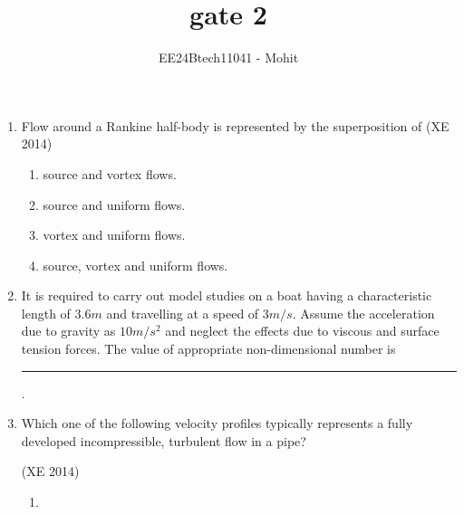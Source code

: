 \documentclass[journal,12pt,onecolumn]{IEEEtran}
\theoremstyle{remark}
\begin{document}
\title{gate 2}
\author{EE24Btech11041 - Mohit}
\maketitle
\renewcommand{\thefigure}{\theenumi}
\renewcommand{\thetable}{\theenumi}


\begin{enumerate}

\item Flow around a Rankine half-body is represented by the superposition of
\hfill{(XE 2014)}
\begin{enumerate}

\item source and vortex flows.
\item source and uniform flows.
\item vortex and uniform flows.
\item source, vortex and uniform flows.

\end{enumerate}


\item It is required to carry out model studies on a boat having a characteristic length of $3.6 m$ and travelling at a speed of $3 m/s$. Assume the acceleration due to gravity as $10 m/s^{2}$ and neglect the effects due to viscous and surface tension forces. The value of appropriate non-dimensional number is \rule{2cm}{0.4pt}.

\item Which one of the following velocity profiles typically represents a fully developed incompressible, turbulent flow in a pipe? 

\hfill{(XE 2014)}
\begin{multicols}{4}
\begin{enumerate}

\item 



\end{enumerate}
\end{multicols}
\end{enumerate}
\end{document}
